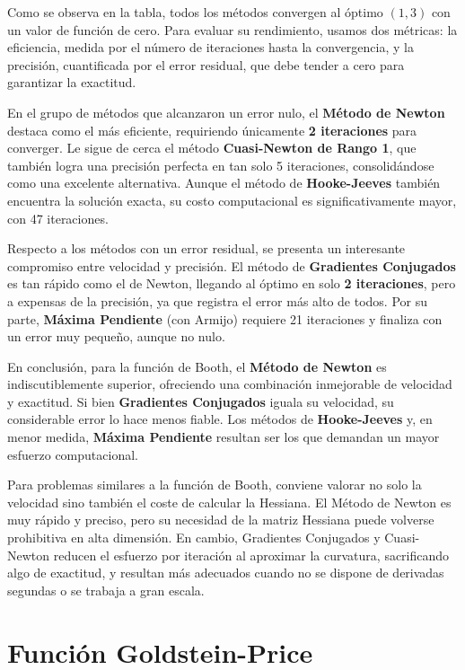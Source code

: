 Como se observa en la tabla, todos los métodos convergen al óptimo $(1, 3)$ con un valor de función de cero. Para evaluar su rendimiento, usamos dos métricas: la eficiencia, medida por el número de iteraciones hasta la convergencia, y la precisión, cuantificada por el error residual, que debe tender a cero para garantizar la exactitud.

En el grupo de métodos que alcanzaron un error nulo, el \textbf{Método de Newton} destaca como el más eficiente, requiriendo únicamente \textbf{2 iteraciones} para converger. Le sigue de cerca el método \textbf{Cuasi-Newton de Rango 1}, que también logra una precisión perfecta en tan solo 5 iteraciones, consolidándose como una excelente alternativa. Aunque el método de \textbf{Hooke-Jeeves} también encuentra la solución exacta, su costo computacional es significativamente mayor, con 47 iteraciones.

Respecto a los métodos con un error residual, se presenta un interesante compromiso entre velocidad y precisión. El método de \textbf{Gradientes Conjugados} es tan rápido como el de Newton, llegando al óptimo en solo \textbf{2 iteraciones}, pero a expensas de la precisión, ya que registra el error más alto de todos. Por su parte, \textbf{Máxima Pendiente} (con Armijo) requiere 21 iteraciones y finaliza con un error muy pequeño, aunque no nulo.

En conclusión, para la función de Booth, el \textbf{Método de Newton} es indiscutiblemente superior, ofreciendo una combinación inmejorable de velocidad y exactitud. Si bien \textbf{Gradientes Conjugados} iguala su velocidad, su considerable error lo hace menos fiable. Los métodos de \textbf{Hooke-Jeeves} y, en menor medida, \textbf{Máxima Pendiente} resultan ser los que demandan un mayor esfuerzo computacional.

Para problemas similares a la función de Booth, conviene valorar no solo la velocidad sino también el coste de calcular la Hessiana. El Método de Newton es muy rápido y preciso, pero su necesidad de la matriz Hessiana puede volverse prohibitiva en alta dimensión. En cambio, Gradientes Conjugados y Cuasi-Newton reducen el esfuerzo por iteración al aproximar la curvatura, sacrificando algo de exactitud, y resultan más adecuados cuando no se dispone de derivadas segundas o se trabaja a gran escala.

\section{Función Goldstein-Price} %

